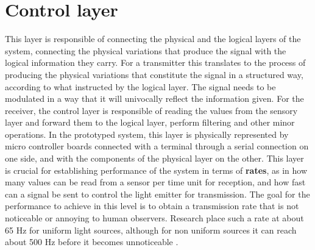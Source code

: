 \section{Control layer}

This layer is responsible of connecting the physical and the logical layers of the system, connecting the physical variations that produce the signal with the logical information they carry.
For a transmitter this translates to the process of producing the physical variations that constitute the signal in a structured way, according to what instructed by the logical layer.
The signal needs to be modulated in a way that it will univocally reflect the information given.
For the receiver, the control layer is responsible of reading the values from the sensory layer and forward them to the logical layer, perform filtering and other minor operations.
In the prototyped system, this layer is physically represented by micro controller boards connected with a terminal through a serial connection on one side, and with the components of the physical layer on the other.
This layer is crucial for establishing performance of the system in terms of \textbf{rates}, as in how many values can be read from a sensor per time unit for reception, and how fast can a signal be sent to control the light emitter for transmission.
The goal for the performance to achieve in this level is to obtain a transmission rate that is not noticeable or annoying to human observers.
Research place such a rate at about 65 Hz for uniform light sources, although for non uniform sources it can reach about 500 Hz before it becomes unnoticeable \cite{eye}.

